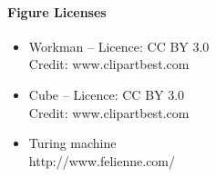 \begin{frame}{\alg}
\framesubtitle{Figure Licenses}
\begin{itemize}
    \item Workman -- Licence: CC BY 3.0 \\ Credit: www.clipartbest.com
    \item Cube -- Licence: CC BY 3.0 \\ Credit: www.clipartbest.com
    \item Turing machine \\ http://www.felienne.com/
\end{itemize}
\end{frame}


